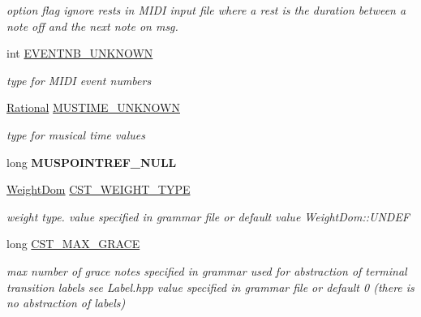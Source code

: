 \begin{DoxyCompactItemize}
\begin{DoxyCompactList}\small\item\em option flag ignore rests in M\+I\+DI input file where a rest is the duration between a note off and the next note on msg. \end{DoxyCompactList}\item 
\mbox{\label{group__general_gac3b19762b16f33de03662fd4289fe5a9}} 
int \mbox{\hyperlink{group__general_gac3b19762b16f33de03662fd4289fe5a9}{E\+V\+E\+N\+T\+N\+B\+\_\+\+U\+N\+K\+N\+O\+WN}}
\begin{DoxyCompactList}\small\item\em type for M\+I\+DI event numbers \end{DoxyCompactList}\item 
\mbox{\label{group__general_gae862a9d955eb3154601efb64980ac24b}} 
\mbox{\hyperlink{classRational}{Rational}} \mbox{\hyperlink{group__general_gae862a9d955eb3154601efb64980ac24b}{M\+U\+S\+T\+I\+M\+E\+\_\+\+U\+N\+K\+N\+O\+WN}}
\begin{DoxyCompactList}\small\item\em type for musical time values \end{DoxyCompactList}\item 
\mbox{\label{group__general_gab5f3e741743d1273f9b9219e7f3c6845}} 
long {\bfseries M\+U\+S\+P\+O\+I\+N\+T\+R\+E\+F\+\_\+\+N\+U\+LL}
\item 
\mbox{\label{group__general_ga5fbff41194dc7e48cea03604b5d7a060}} 
\mbox{\hyperlink{group__general_gae07bdce6f4896785ead3b815ca6ab560}{Weight\+Dom}} \mbox{\hyperlink{group__general_ga5fbff41194dc7e48cea03604b5d7a060}{C\+S\+T\+\_\+\+W\+E\+I\+G\+H\+T\+\_\+\+T\+Y\+PE}}
\begin{DoxyCompactList}\small\item\em weight type. value specified in grammar file or default value Weight\+Dom\+::\+U\+N\+D\+EF \end{DoxyCompactList}\item 
\mbox{\label{group__general_ga942f8553c6b44bf0ed10f6c167794e89}} 
long \mbox{\hyperlink{group__general_ga942f8553c6b44bf0ed10f6c167794e89}{C\+S\+T\+\_\+\+M\+A\+X\+\_\+\+G\+R\+A\+CE}}
\begin{DoxyCompactList}\small\item\em max number of grace notes specified in grammar used for abstraction of terminal transition labels see Label.\+hpp value specified in grammar file or default 0 (there is no abstraction of labels) \end{DoxyCompactList}\item 

\end{DoxyCompactItemize}
